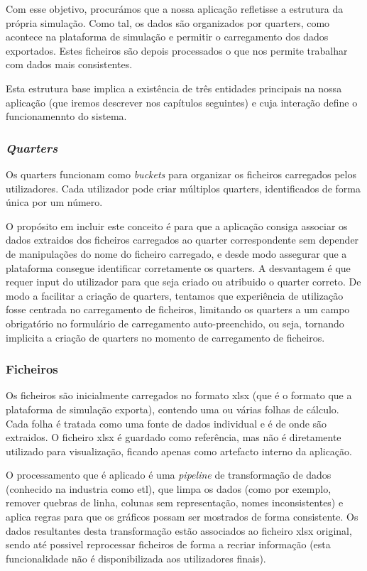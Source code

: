 Com esse objetivo, procurámos que a nossa aplicação refletisse a estrutura da própria simulação. Como tal, os dados são organizados por quarters, como acontece na plataforma de simulação e permitir o carregamento dos dados exportados. Estes ficheiros são depois processados o que nos permite trabalhar com dados mais consistentes. 

Esta estrutura base implica a existência de três entidades principais na nossa aplicação (que iremos descrever nos capítulos seguintes) e cuja interação define  o funcionamennto do sistema.

\subsubsection{\textit{Quarters}}

Os quarters funcionam como \textit{buckets} para organizar os ficheiros carregados pelos utilizadores. Cada utilizador pode criar múltiplos quarters, identificados de forma única por um número.

O propósito em incluir este conceito é para que a aplicação consiga associar os dados extraidos dos ficheiros carregados ao quarter correspondente sem depender de manipulações do nome do ficheiro carregado, e desde modo assegurar que a plataforma consegue identificar corretamente os quarters. A desvantagem é que requer input do utilizador para que seja criado ou atribuido o quarter correto. De modo a facilitar a criação de quarters, tentamos que experiência de utilização fosse centrada no carregamento de ficheiros, limitando os quarters a um campo obrigatório no formulário de carregamento auto-preenchido, ou seja, tornando implicita a criação de quarters no momento de carregamento de ficheiros.

\subsubsection{Ficheiros}

Os ficheiros são inicialmente carregados no formato \gls{xlsx} (que é o formato que a plataforma de simulação exporta), contendo uma ou várias folhas de cálculo. Cada folha é tratada como uma fonte de dados individual e é de onde são extraidos. O ficheiro \gls{xlsx} é guardado como referência, mas não é diretamente utilizado para visualização, ficando apenas como artefacto interno da aplicação.

O processamento que é aplicado é uma \textit{pipeline} de transformação de dados (conhecido na industria como \gls{etl}), que limpa os dados (como por exemplo, remover quebras de linha, colunas sem representação, nomes inconsistentes) e aplica regras para que os gráficos possam ser mostrados de forma consistente. Os dados resultantes desta transformação estão associados ao ficheiro \gls{xlsx} original, sendo até possivel reprocessar ficheiros de forma a recriar informação (esta funcionalidade não é disponibilizada aos utilizadores finais).

